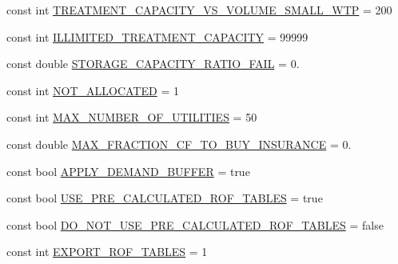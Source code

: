 \begin{DoxyCompactItemize}
\item 
const int \mbox{\hyperlink{namespaceConstants_ae054475fbe2eafea2a6417bddf4d07c9_ae054475fbe2eafea2a6417bddf4d07c9}{T\+R\+E\+A\+T\+M\+E\+N\+T\+\_\+\+C\+A\+P\+A\+C\+I\+T\+Y\+\_\+\+V\+S\+\_\+\+V\+O\+L\+U\+M\+E\+\_\+\+S\+M\+A\+L\+L\+\_\+\+W\+TP}} = 200
\item 
const int \mbox{\hyperlink{namespaceConstants_a878f191b27592c59c7d708412dee03af_a878f191b27592c59c7d708412dee03af}{I\+L\+L\+I\+M\+I\+T\+E\+D\+\_\+\+T\+R\+E\+A\+T\+M\+E\+N\+T\+\_\+\+C\+A\+P\+A\+C\+I\+TY}} = 99999
\item 
const double \mbox{\hyperlink{namespaceConstants_a70548c8633a7d66b6bae5178050ed0bb_a70548c8633a7d66b6bae5178050ed0bb}{S\+T\+O\+R\+A\+G\+E\+\_\+\+C\+A\+P\+A\+C\+I\+T\+Y\+\_\+\+R\+A\+T\+I\+O\+\_\+\+F\+A\+IL}} = 0.
\item 
const int \mbox{\hyperlink{namespaceConstants_a2cc0fab82afeeae81786ee3a0ce6ffd5_a2cc0fab82afeeae81786ee3a0ce6ffd5}{N\+O\+T\+\_\+\+A\+L\+L\+O\+C\+A\+T\+ED}} = 1
\item 
const int \mbox{\hyperlink{namespaceConstants_a456bb204b432ca85d517cdf525f19f88_a456bb204b432ca85d517cdf525f19f88}{M\+A\+X\+\_\+\+N\+U\+M\+B\+E\+R\+\_\+\+O\+F\+\_\+\+U\+T\+I\+L\+I\+T\+I\+ES}} = 50
\item 
const double \mbox{\hyperlink{namespaceConstants_a17512938d5dc372ac321263e35d4022e_a17512938d5dc372ac321263e35d4022e}{M\+A\+X\+\_\+\+F\+R\+A\+C\+T\+I\+O\+N\+\_\+\+C\+F\+\_\+\+T\+O\+\_\+\+B\+U\+Y\+\_\+\+I\+N\+S\+U\+R\+A\+N\+CE}} = 0.
\item 
const bool \mbox{\hyperlink{namespaceConstants_a6d0d721f1c6d8807ddeb8b80eb165108_a6d0d721f1c6d8807ddeb8b80eb165108}{A\+P\+P\+L\+Y\+\_\+\+D\+E\+M\+A\+N\+D\+\_\+\+B\+U\+F\+F\+ER}} = true
\item 
const bool \mbox{\hyperlink{namespaceConstants_a0c69d51d8e08085d471b00c76429814d_a0c69d51d8e08085d471b00c76429814d}{U\+S\+E\+\_\+\+P\+R\+E\+\_\+\+C\+A\+L\+C\+U\+L\+A\+T\+E\+D\+\_\+\+R\+O\+F\+\_\+\+T\+A\+B\+L\+ES}} = true
\item 
const bool \mbox{\hyperlink{namespaceConstants_a192db63969de3947979b65b4b85f3c40_a192db63969de3947979b65b4b85f3c40}{D\+O\+\_\+\+N\+O\+T\+\_\+\+U\+S\+E\+\_\+\+P\+R\+E\+\_\+\+C\+A\+L\+C\+U\+L\+A\+T\+E\+D\+\_\+\+R\+O\+F\+\_\+\+T\+A\+B\+L\+ES}} = false
\item 
const int \mbox{\hyperlink{namespaceConstants_a499714392cf1a633678cc58ebd2868fd_a499714392cf1a633678cc58ebd2868fd}{E\+X\+P\+O\+R\+T\+\_\+\+R\+O\+F\+\_\+\+T\+A\+B\+L\+ES}} = 1
\item 

\end{DoxyCompactItemize}
